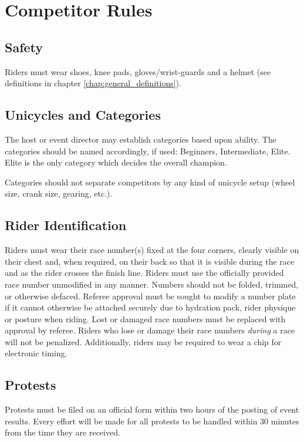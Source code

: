\chapter{Competitor Rules}

\section{Safety}
Riders must wear shoes, knee pads, gloves/wrist-guards and a helmet (see definitions in chapter \ref{chap:general_definitions}).

\section{Unicycles and Categories}

The host or event director may establish categories based upon ability.
The categories should be named accordingly, if used: Beginners, Intermediate, Elite.
Elite is the only category which decides the overall champion.

Categories should not separate competitors by any kind of unicycle setup (wheel size, crank size, gearing, etc.).

\section{Rider Identification}

Riders must wear their race number(s) fixed at the four corners, clearly visible on their chest and, when required, on their back so that it is visible during the race and as the rider crosses the finish line.
Riders must use the officially provided race number unmodified in any manner.
Numbers should not be folded, trimmed, or otherwise defaced.
Referee approval must be sought to modify a number plate if it cannot otherwise be attached securely due to hydration pack, rider physique or posture when riding.
Lost or damaged race numbers must be replaced with approval by referee.
Riders who lose or damage their race numbers \textit{during} a race will not be penalized.
Additionally, riders may be required to wear a chip for electronic timing.

\section{Protests}

Protests must be filed on an official form within two hours of the posting of event results.
Every effort will be made for all protests to be handled within 30 minutes from the time they are received.

